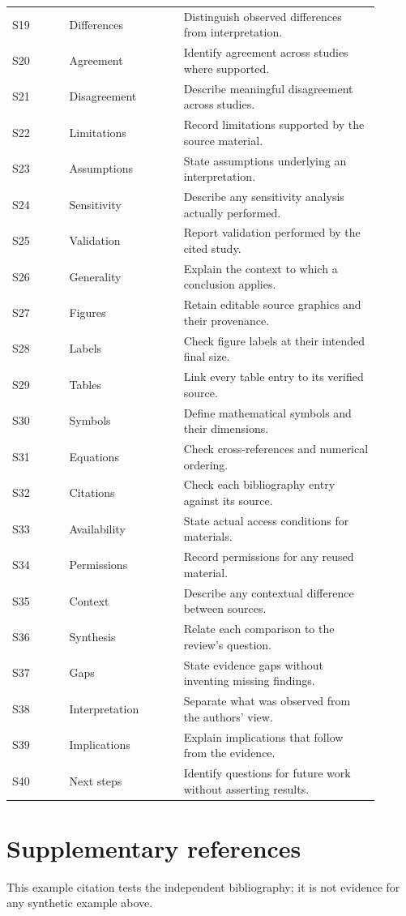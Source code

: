 \documentclass[11pt,a4paper]{article}
\begin{document}
\begin{longtable}{@{}p{0.14\linewidth}p{0.28\linewidth}p{0.48\linewidth}@{}}
S19 & Differences & Distinguish observed differences from interpretation.\\
S20 & Agreement & Identify agreement across studies where supported.\\
S21 & Disagreement & Describe meaningful disagreement across studies.\\
S22 & Limitations & Record limitations supported by the source material.\\
S23 & Assumptions & State assumptions underlying an interpretation.\\
S24 & Sensitivity & Describe any sensitivity analysis actually performed.\\
S25 & Validation & Report validation performed by the cited study.\\
S26 & Generality & Explain the context to which a conclusion applies.\\
S27 & Figures & Retain editable source graphics and their provenance.\\
S28 & Labels & Check figure labels at their intended final size.\\
S29 & Tables & Link every table entry to its verified source.\\
S30 & Symbols & Define mathematical symbols and their dimensions.\\
S31 & Equations & Check cross-references and numerical ordering.\\
S32 & Citations & Check each bibliography entry against its source.\\
S33 & Availability & State actual access conditions for materials.\\
S34 & Permissions & Record permissions for any reused material.\\
S35 & Context & Describe any contextual difference between sources.\\
S36 & Synthesis & Relate each comparison to the review's question.\\
S37 & Gaps & State evidence gaps without inventing missing findings.\\
S38 & Interpretation & Separate what was observed from the authors' view.\\
S39 & Implications & Explain implications that follow from the evidence.\\
S40 & Next steps & Identify questions for future work without asserting results.\\
\end{longtable}
\normalsize

\section{Supplementary references}
This example citation tests the independent bibliography\cite{wilkinson2016fair};
it is not evidence for any synthetic example above.


\end{document}

